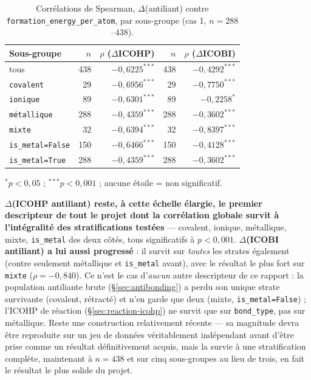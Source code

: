 \documentclass[11pt,a4paper]{article}
\begin{document}
\begin{table}[htbp]
\centering
\caption{Corrélations de Spearman, $\Delta$(antiliant) contre \texttt{formation\_energy\_per\_atom}, par sous-groupe (cas 1, $n=288$--$438$).}
\label{tab:delta-antibonding-stratified}
\begin{tabular}{@{}lrrrr@{}}
\toprule
Sous-groupe & $n$ & $\rho$ ($\Delta$ICOHP) & $n$ & $\rho$ ($\Delta$ICOBI) \\
\midrule
tous                & 438 & $-0{,}6225^{***}$ & 438 & $-0{,}4292^{***}$ \\
\texttt{covalent}   & 29  & $-0{,}6956^{***}$ & 29  & $-0{,}7750^{***}$ \\
\texttt{ionique}    & 89  & $-0{,}6301^{***}$ & 89  & $-0{,}2258^{*}$ \\
\texttt{métallique} & 288 & $-0{,}4359^{***}$ & 288 & $-0{,}3602^{***}$ \\
\texttt{mixte}      & 32  & $-0{,}6394^{***}$ & 32  & $-0{,}8397^{***}$ \\
\texttt{is\_metal=False} & 150 & $-0{,}6466^{***}$ & 150 & $-0{,}4128^{***}$ \\
\texttt{is\_metal=True}  & 288 & $-0{,}4359^{***}$ & 288 & $-0{,}3602^{***}$ \\
\bottomrule
\end{tabular}

\vspace{0.15cm}
{\footnotesize $^{*}p<0{,}05$ ; $^{***}p<0{,}001$ ; aucune étoile = non
significatif.}
\end{table}

\textbf{$\Delta$(ICOHP antiliant) reste, à cette échelle élargie, le
premier descripteur de tout le projet dont la corrélation globale
survit à l'intégralité des stratifications testées} --- covalent,
ionique, métallique, mixte, \texttt{is\_metal} des deux côtés, tous
significatifs à $p<0{,}001$. \textbf{$\Delta$(ICOBI antiliant) a
lui aussi progressé} : il survit sur \emph{toutes} les
strates également (contre seulement métallique et \texttt{is\_metal}
avant), avec le résultat le plus fort sur \texttt{mixte}
($\rho=-0{,}840$). Ce n'est le cas d'\emph{aucun} autre descripteur de
ce rapport : la population antiliante brute (\S\ref{sec:antibonding})
a perdu son unique strate survivante (covalent, rétracté) et n'en garde
que deux (mixte, \texttt{is\_metal=False}) ; l'ICOHP de réaction
(\S\ref{sec:reaction-icohp}) ne survit que sur \texttt{bond\_type},
pas sur métallique. Reste une construction relativement récente --- sa
magnitude devra être reproduite sur un jeu de données véritablement
indépendant avant d'être prise comme un résultat définitivement acquis,
mais la survie à une stratification complète, maintenant à $n=438$ et
sur cinq sous-groupes au lieu de trois, en fait le résultat le plus
solide du projet.
\end{document}
